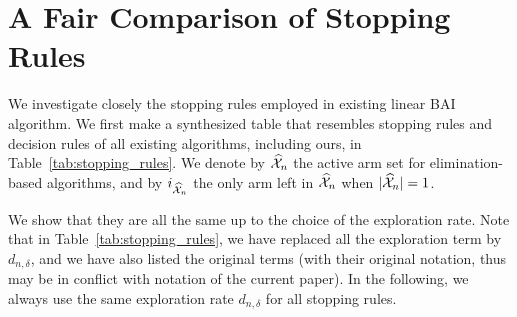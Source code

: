 \section{A Fair Comparison of Stopping Rules}\label{app:lgc.stopping}

We investigate closely the stopping rules employed in existing linear BAI algorithm. We first make a synthesized table that resembles stopping rules and decision rules of all existing algorithms, including ours, in Table~\ref{tab:stopping_rules}. We denote by $\widehat{\mathcal{X}}_n$ the active arm set for elimination-based algorithms, and by $i_{\widehat{\mathcal{X}}_n}$ the only arm left in $\widehat{\mathcal{X}}_n$ when $|\widehat{\mathcal{X}}_n|=1$.

We show that they are all the same up to the choice of the exploration rate. Note that in Table~\ref{tab:stopping_rules}, we have replaced all the exploration term by $d_{n,\delta}$, and we have also listed the original terms (with their original notation, thus may be in conflict with notation of the current paper). In the following, we always use the same exploration rate $d_{n,\delta}$ for all stopping rules.

